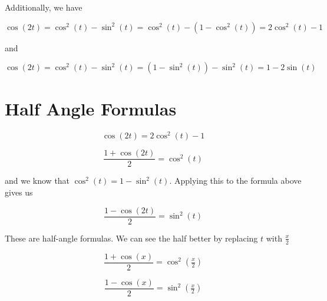 \documentclass{ximera}
\begin{document}
Additionally, we have 




\[   \cos(2t) =    \cos^2(t) - \sin^2(t)  =    \cos^2(t) - (1 - \cos^2(t)) =  2 \cos^2(t) - 1 \]


and

\[   \cos(2t) =    \cos^2(t) - \sin^2(t)  =    (1 - \sin^2(t)) - \sin^2(t)  = 1 - 2 \sin(t)     \]




































\section{Half Angle Formulas}



\[   \cos(2t)  =  2 \cos^2(t) - 1 \]


\[   \frac{1 + \cos(2t)}{2}  =   \cos^2(t)  \]



and we know that $\cos^2(t) = 1- \sin^2(t)$. Applying this to the formula above gives us

\[  \frac{1 -  \cos(2t)}{2}  =  \sin^2(t)     \]



These are half-angle formulas.  We can see the half better by replacing $t$ with $\frac{x}{2}$



\[   \frac{1 + \cos(x)}{2}  =   \cos^2\left( \tfrac{x}{2} \right)  \]



\[   \frac{1 - \cos(x)}{2}  =   \sin^2\left( \tfrac{x}{2} \right)  \]
\end{document}

